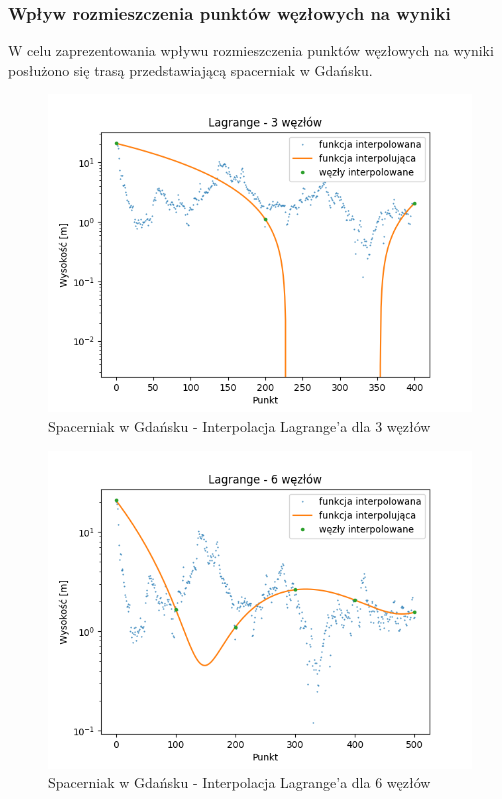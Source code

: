\documentclass[12pt]{extarticle}
\begin{document}
\subsubsection*{Wpływ rozmieszczenia punktów węzłowych na wyniki}
W celu zaprezentowania wpływu rozmieszczenia punktów węzłowych na wyniki posłużono się trasą przedstawiającą spacerniak w Gdańsku.
\begin{figure}[H]
    \centering
    \includegraphics[scale=0.8]{interpolation_SpacerniakGdansk_Lagrange_3.png}
    \caption{Spacerniak w Gdańsku - Interpolacja Lagrange'a dla 3 węzłów}
\end{figure}
\begin{figure}[H]
    \centering
    \includegraphics[scale=0.8]{interpolation_SpacerniakGdansk_Lagrange_6.png}
    \caption{Spacerniak w Gdańsku - Interpolacja Lagrange'a dla 6 węzłów}
\end{figure}
\end{document}
